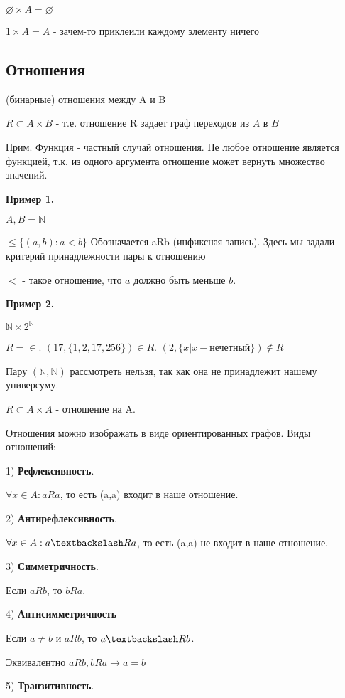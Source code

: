 \documentclass{article}
\begin{document}
$\varnothing \times A = \varnothing$

$1 \times A = A$ - зачем-то приклеили  каждому элементу ничего

\subsection*{Отношения}

(бинарные) отношения между A и B

$R \subset A \times B$ - т.е. отношение R задает граф переходов из $A$ в $B$

Прим. Функция - частный случай отношения. Не любое отношение является функцией, т.к. из одного аргумента отношение может вернуть множество значений.

\textbf{Пример 1.}

$A,B = \mathds{N}$

$\le \{(a,b): a<b\}$ Обозначается aRb (инфиксная запись). Здесь мы задали критерий принадлежности пары к отношению

$<$ - такое отношение, что $a$ должно быть меньше $b$.

\textbf{Пример 2.}

$\mathds{N} \times 2^\mathds{N}$

$R = \in $. $(17, \{1, 2, 17, 256\}) \in R$. $(2, \{x | x - \text{нечетный}\}) \notin R$

Пару $(\mathds{N}, \mathds{N})$ рассмотреть нельзя, так как она не принадлежит нашему универсуму.



$R \subset A \times A$ - отношение на A.

Отношения можно изображать в виде ориентированных графов.
Виды отношений: 

1) \textbf{Рефлексивность}.

$\forall x \in A: aRa$, то есть (a,a) входит в наше отношение.

2) \textbf{Антирефлексивность}.

$\forall x \in A: a\textbackslash Ra$, то есть (a,a) не входит в наше отношение.

3) \textbf{Симметричность}.

Если $aRb$, то $bRa$.

4) \textbf{Антисимметричность} 

Если $a\neq b$ и $aRb$, то $a\textbackslash Rb$.

Эквивалентно $aRb, bRa \rightarrow a=b$

5) \textbf{Транзитивность}.
\end{document}
